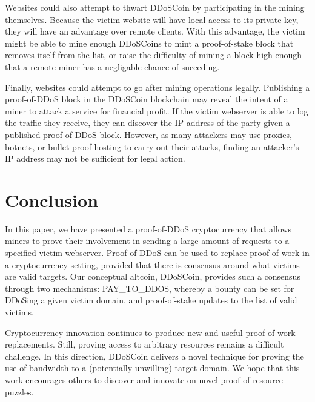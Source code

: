 Websites could also attempt to thwart DDoSCoin by participating in the mining
themselves. Because the victim website will have local access to its private
key, they will have an advantage over remote clients. With this advantage, the
victim might be able to mine enough DDoSCoins to mint a proof-of-stake block
that removes itself from the list, or raise the difficulty of mining a block
high enough that a remote miner has a negligable chance of suceeding.

Finally, websites could attempt to go after mining operations legally.
Publishing a proof-of-DDoS block in the DDoSCoin blockchain may reveal the
intent of a miner to attack a service for financial profit. If the victim webserver is able to
log the traffic they receive, they can discover the IP address of the party
given a published proof-of-DDoS block. However, as many attackers may use proxies,
botnets, or bullet-proof hosting to carry out their attacks, finding an
attacker's IP address may not be sufficient for legal action.


\section{Conclusion}

In this paper, we have presented a proof-of-DDoS cryptocurrency that allows
miners to prove their involvement in sending a large amount of requests to a
specified victim webserver. Proof-of-DDoS can be used to replace proof-of-work
in a cryptocurrency setting, provided that there is consensus around what
victims are valid targets. Our conceptual altcoin, DDoSCoin, provides such a
consensus through two mechanisms: PAY\_TO\_DDOS, whereby a bounty can be set for
DDoSing a given victim domain, and proof-of-stake updates to the list of valid
victims.

Cryptocurrency innovation continues to produce new and useful proof-of-work
replacements. Still, proving access to arbitrary resources remains a difficult
challenge. In this direction, DDoSCoin delivers a novel technique for proving
the use of bandwidth to a (potentially unwilling) target domain. We hope that
this work encourages others to discover and innovate on novel proof-of-resource
puzzles.

{\footnotesize\balance

}


